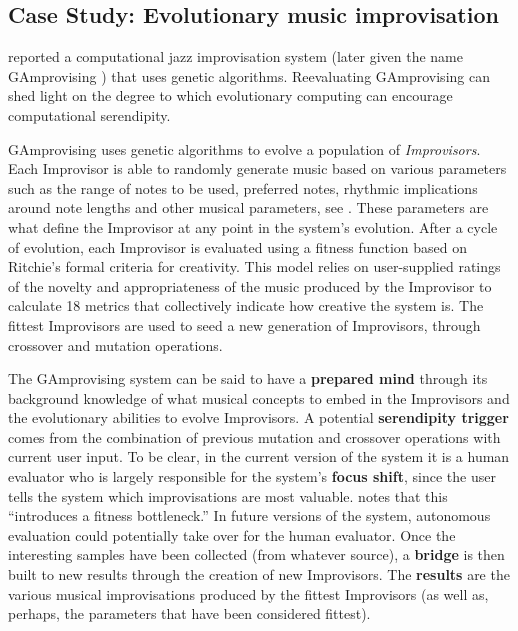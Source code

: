 \subsection{Case Study: Evolutionary music improvisation} \label{sec:evomusic}

 reported a computational jazz improvisation system
(later given the name {\sf GAmprovising} \cite{jordanous:12}) that
uses genetic algorithms.  Reevaluating {\sf GAmprovising} can shed
light on the degree to which evolutionary computing can encourage
computational serendipity.

{\sf GAmprovising} uses genetic algorithms to evolve a population of \emph{Improvisors}. Each Improvisor is able to randomly generate music based on various parameters such as the range of notes to be used, preferred notes, rhythmic implications around note lengths and other musical parameters, see \cite{jordanous10}. These parameters are what define the Improvisor at any point in the system's evolution.  After a cycle of evolution, each Improvisor is evaluated using a fitness function based on Ritchie's \citeyear{ritchie07} formal criteria for creativity.  This model relies on user-supplied ratings of the novelty and appropriateness of the music produced by the Improvisor to calculate 18 metrics that collectively indicate how creative the system is.  The fittest Improvisors are used to seed a new generation of Improvisors, through crossover and mutation operations.

The {\sf GAmprovising} system can be said to have a \textbf{prepared mind} through its background knowledge of what musical concepts to embed in the Improvisors and the evolutionary abilities to evolve Improvisors. A potential \textbf{serendipity trigger} comes from the combination of previous mutation and crossover operations with current user input.  To be clear, in the current version of the system it is a human evaluator who is largely responsible for the system's \textbf{focus shift}, since the user tells the system which improvisations are most valuable.   
notes that this ``introduces a fitness bottleneck.''  In future versions of the system, autonomous evaluation could potentially take over for the human evaluator.  Once the interesting samples have been collected (from whatever source), a \textbf{bridge} is then built to new results through the creation of new Improvisors.  The \textbf{results} are the various musical improvisations produced by the fittest Improvisors (as well as, perhaps, the parameters that have been considered fittest).

